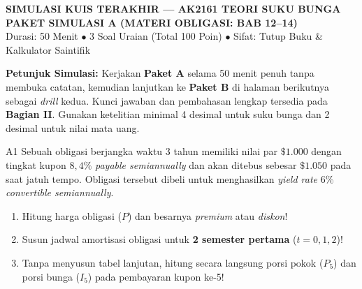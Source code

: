 \documentclass[11pt,a4paper]{article}
\begin{document}
\begin{tcolorbox}[
    enhanced,
    colback=primaryblue,
    colframe=primaryblue,
    arc=2mm,
    left=4mm,right=4mm,top=3.5mm,bottom=3.5mm,
    boxrule=0pt
]
\begin{center}
    {\fontsize{14}{17}\selectfont\bfseries\color{white} SIMULASI KUIS TERAKHIR --- AK2161 TEORI SUKU BUNGA}\\[1mm]
    {\fontsize{12}{15}\selectfont\bfseries\color{amberbg} PAKET SIMULASI A (MATERI OBLIGASI: BAB 12--14)}\\[1mm]
    {\fontsize{9.5}{12}\selectfont\color{white} Durasi: 50 Menit $\bullet$ 3 Soal Uraian (Total 100 Poin) $\bullet$ Sifat: Tutup Buku \& Kalkulator Saintifik}
\end{center}
\end{tcolorbox}

\begin{tcolorbox}[
    enhanced,
    colback=boxbg,
    colframe=secondaryblue,
    arc=1.5mm,
    boxrule=0.6pt,
    left=3mm,right=3mm,top=2mm,bottom=2mm
]
\small
\textbf{Petunjuk Simulasi:} Kerjakan \textbf{Paket A} selama 50 menit penuh tanpa membuka catatan, kemudian lanjutkan ke \textbf{Paket B} di halaman berikutnya sebagai \textit{drill} kedua. Kunci jawaban dan pembahasan lengkap tersedia pada \textbf{Bagian II}. Gunakan ketelitian minimal 4 desimal untuk suku bunga dan 2 desimal untuk nilai mata uang.
\end{tcolorbox}

\begin{naskahsoalbox}{A1}
Sebuah obligasi berjangka waktu 3 tahun memiliki nilai par $\$1.000$ dengan tingkat kupon $8{,}4\%$ \textit{payable semiannually} dan akan ditebus sebesar $\$1.050$ pada saat jatuh tempo. Obligasi tersebut dibeli untuk menghasilkan \textit{yield rate} $6\%$ \textit{convertible semiannually}.
\begin{enumerate}[label=(\alph*), leftmargin=6mm, topsep=1pt, itemsep=1.5pt]
    \item Hitung harga obligasi ($P$) dan besarnya \textit{premium} atau \textit{diskon}!
    \item Susun jadwal amortisasi obligasi untuk \textbf{2 semester pertama} ($t = 0, 1, 2$)!
    \item Tanpa menyusun tabel lanjutan, hitung secara langsung porsi pokok ($P_5$) dan porsi bunga ($I_5$) pada pembayaran kupon ke-5!
\end{enumerate}
\end{naskahsoalbox}
\end{document}
